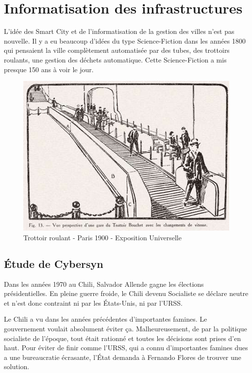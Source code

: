 \chapter{Informatisation des infrastructures}

L'idée des Smart City et de l'informatisation de la gestion des villes n'est pas nouvelle.
Il y a eu beaucoup d'idées du type Science-Fiction dans les années 1800 qui pensaient la ville
complètement automatisée par des tubes, des trottoirs roulants, une gestion des déchets automatique.
Cette Science-Fiction a mis presque 150 ans à voir le jour.

\begin{figure}[h]
  \centering
  \includegraphics[scale=0.30]{media/trottoir_roulant.jpg}
  \caption{Trottoir roulant - Paris 1900 - Exposition Universelle}
\end{figure}

\section{Étude de Cybersyn}

Dans les années 1970 au Chili, Salvador Allende gagne les élections présidentielles.
En pleine guerre froide, le Chili devenu Socialiste se déclare neutre et n'est donc
contraint ni par les États-Unis, ni par l'URSS.

Le Chili a vu dans les années précédentes d'importantes famines. Le gouvernement voulait
absolument éviter ça. Malheureusement, de par la politique socialiste de l'époque,
tout était rationné et toutes les décisions sont prises d'en haut.
Pour éviter de finir comme l'URSS, qui a connu d'importantes famines dues a une
bureaucratie écrasante, l'État demanda à Fernando Flores de trouver une solution.

